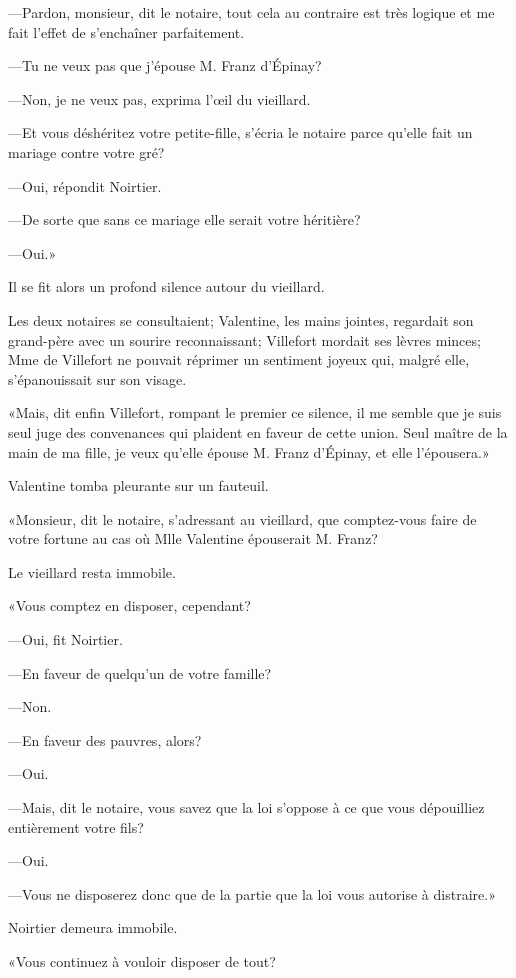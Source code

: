 —Pardon, monsieur, dit le notaire, tout cela au contraire est très logique et me fait l'effet de s'enchaîner parfaitement. 

—Tu ne veux pas que j'épouse M. Franz d'Épinay? 

—Non, je ne veux pas, exprima l'œil du vieillard. 

—Et vous déshéritez votre petite-fille, s'écria le notaire parce qu'elle fait un mariage contre votre gré? 

—Oui, répondit Noirtier. 

—De sorte que sans ce mariage elle serait votre héritière? 

—Oui.» 

Il se fit alors un profond silence autour du vieillard. 

Les deux notaires se consultaient; Valentine, les mains jointes, regardait son grand-père avec un sourire reconnaissant; Villefort mordait ses lèvres minces; Mme de Villefort ne pouvait réprimer un sentiment joyeux qui, malgré elle, s'épanouissait sur son visage. 

«Mais, dit enfin Villefort, rompant le premier ce silence, il me semble que je suis seul juge des convenances qui plaident en faveur de cette union. Seul maître de la main de ma fille, je veux qu'elle épouse M. Franz d'Épinay, et elle l'épousera.» 

Valentine tomba pleurante sur un fauteuil. 

«Monsieur, dit le notaire, s'adressant au vieillard, que comptez-vous faire de votre fortune au cas où Mlle Valentine épouserait M. Franz? 

Le vieillard resta immobile. 

«Vous comptez en disposer, cependant? 

—Oui, fit Noirtier. 

—En faveur de quelqu'un de votre famille? 

—Non. 

—En faveur des pauvres, alors? 

—Oui. 

—Mais, dit le notaire, vous savez que la loi s'oppose à ce que vous dépouilliez entièrement votre fils? 

—Oui. 

—Vous ne disposerez donc que de la partie que la loi vous autorise à distraire.» 

Noirtier demeura immobile. 

«Vous continuez à vouloir disposer de tout? 

